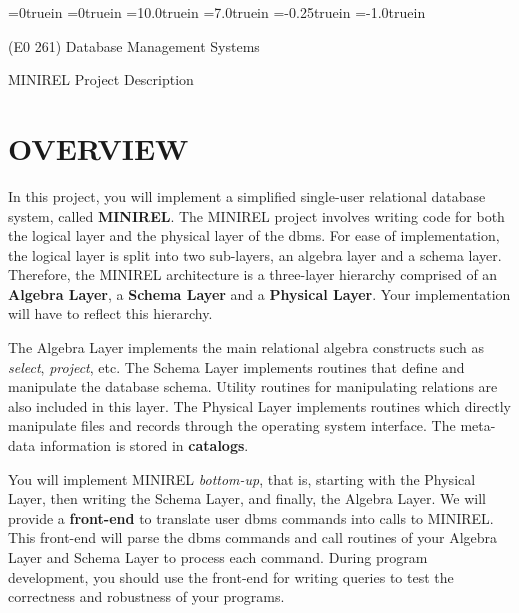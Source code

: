 
\headheight=0truein
\headsep=0truein
\textheight=10.0truein
\textwidth=7.0truein
\oddsidemargin=-0.25truein
\topmargin=-1.0truein
\newcommand{\COMMENT}[1]{}
\sloppy


\begin{center}
\begin{Large}
\begin{bf}
(E0 261) \/ Database Management Systems 

\vspace*{0.1in}

{ MINIREL \/ Project \/ Description}
\end{bf}
\end{Large}
\end{center}

\section{OVERVIEW}
In this project, you will implement a simplified single-user relational
database system, called {\bf MINIREL}.  The MINIREL project involves
writing code for both the logical layer and the physical layer of the
dbms.  For ease of implementation, the logical layer is split into two
sub-layers, an algebra layer and a schema layer.  Therefore, the
MINIREL architecture is a three-layer hierarchy comprised of an {\bf
Algebra Layer}, a {\bf Schema Layer} and a {\bf Physical Layer}.  Your
implementation will have to reflect this hierarchy.

The Algebra Layer implements the main relational algebra constructs
such as \emph{select}, \emph{project}, etc.  The Schema Layer
implements routines that define and manipulate the database schema.
Utility routines for manipulating relations are also included in this
layer.  The Physical Layer implements routines which directly
manipulate files and records through the operating system interface.
The meta-data information is stored in {\bf catalogs}.

You will implement MINIREL \emph{bottom-up}, that is, starting with
the Physical Layer, then writing the Schema Layer, and finally, the
Algebra Layer.  We will provide a {\bf front-end} to translate user
dbms commands into calls to MINIREL.  This front-end will parse the
dbms commands and call routines of your Algebra Layer and Schema Layer
to process each command.  During program development, you should use
the front-end for writing queries to test the correctness and
robustness of your programs.

